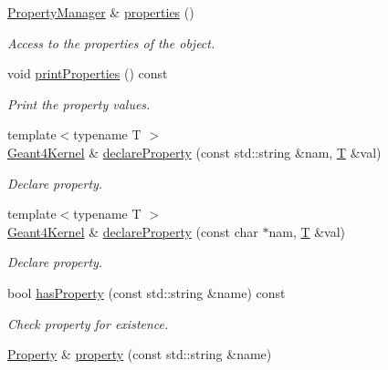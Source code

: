 \begin{DoxyCompactItemize}
\hyperlink{class_d_d4hep_1_1_property_manager}{PropertyManager} \& \hyperlink{class_d_d4hep_1_1_simulation_1_1_geant4_kernel_a39d0b3dcebed9c0ec950410df346710b}{properties} ()
\begin{DoxyCompactList}\small\item\em Access to the properties of the object. \item\end{DoxyCompactList}\item 
void \hyperlink{class_d_d4hep_1_1_simulation_1_1_geant4_kernel_a2a2e31125a2bf5f5a40dd132f00d35d1}{printProperties} () const 
\begin{DoxyCompactList}\small\item\em Print the property values. \item\end{DoxyCompactList}\item 
{\footnotesize template$<$typename T $>$ }\\\hyperlink{class_d_d4hep_1_1_simulation_1_1_geant4_kernel}{Geant4Kernel} \& \hyperlink{class_d_d4hep_1_1_simulation_1_1_geant4_kernel_aadb88423f1b7ae7d5cc9e8cfab93c425}{declareProperty} (const std::string \&nam, \hyperlink{class_t}{T} \&val)
\begin{DoxyCompactList}\small\item\em Declare property. \item\end{DoxyCompactList}\item 
{\footnotesize template$<$typename T $>$ }\\\hyperlink{class_d_d4hep_1_1_simulation_1_1_geant4_kernel}{Geant4Kernel} \& \hyperlink{class_d_d4hep_1_1_simulation_1_1_geant4_kernel_aa9f02684c5f94b400f6d2fbe47d3cb55}{declareProperty} (const char $\ast$nam, \hyperlink{class_t}{T} \&val)
\begin{DoxyCompactList}\small\item\em Declare property. \item\end{DoxyCompactList}\item 
bool \hyperlink{class_d_d4hep_1_1_simulation_1_1_geant4_kernel_a615765e129ae5076af6f58e40540c977}{hasProperty} (const std::string \&name) const 
\begin{DoxyCompactList}\small\item\em Check property for existence. \item\end{DoxyCompactList}\item 
\hyperlink{class_d_d4hep_1_1_property}{Property} \& \hyperlink{class_d_d4hep_1_1_simulation_1_1_geant4_kernel_a51c2d757b81b0c8ee31be77515d4d622}{property} (const std::string \&name)

\end{DoxyCompactItemize}
